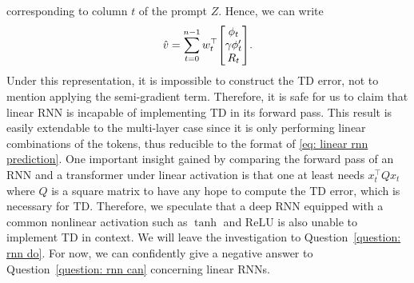 \documentclass{article}
\newcommand{\R}{\mathbb{R}}
\begin{document}
corresponding to column $t$ of the prompt $Z$.
Hence, we can write
\begin{align}
    \hat{v} = \sum_{t=0}^{n-1} w_t^\top \mqty[\phi_t\\\gamma\phi'_t\\R_t].
\end{align}
Under this representation, it is impossible to construct the TD error, not to mention applying the semi-gradient term.
Therefore, it is safe for us to claim that linear RNN is incapable of implementing TD in its forward pass.
This result is easily extendable to the multi-layer case since it is only performing linear combinations of the tokens, thus reducible to the format of \eqref{eq: linear rnn prediction}.
One important insight gained by comparing the forward pass of an RNN and a transformer under linear activation is that one at least needs $x_t^\top Q x_t$ where $Q$ is a square matrix to have any hope to compute the TD error, which is necessary for TD.
Therefore, we speculate that a deep RNN equipped with a common nonlinear activation such as $\tanh$ and $\text{ReLU}$ is also unable to implement TD in context.
We will leave the investigation to Question~\ref{question: rnn do}.
For now, we can confidently give a negative answer to Question~\ref{question: rnn can} concerning linear RNNs.
\end{document}
